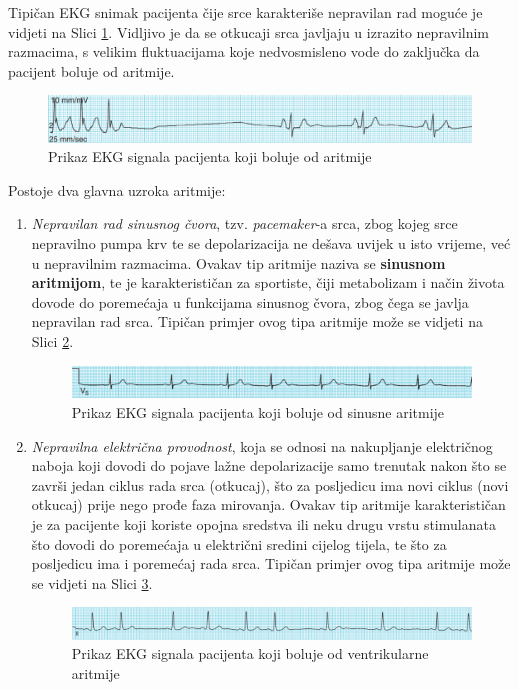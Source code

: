 \documentclass[12pt,a4paper]{article}
\begin{document}
Tipičan EKG snimak pacijenta čije srce karakteriše nepravilan rad moguće je vidjeti na Slici \ref{s2}. Vidljivo je da se otkucaji srca javljaju u izrazito nepravilnim razmacima, s velikim fluktuacijama koje nedvosmisleno vode do zaključka da pacijent boluje od aritmije.

\begin{figure}[H]
\center
\includegraphics[scale=0.6]{../res/s2.PNG}
\caption{Prikaz EKG signala pacijenta koji boluje od aritmije}
\label{s2}
\end{figure}

\quad Postoje dva glavna uzroka aritmije:

\begin{enumerate}

\item \textit{Nepravilan rad sinusnog čvora}, tzv. \textit{pacemaker}-a srca, zbog kojeg srce nepravilno pumpa krv te se depolarizacija ne dešava uvijek u isto vrijeme, već u nepravilnim razmacima. Ovakav tip aritmije naziva se \textbf{sinusnom aritmijom}, te je karakterističan za sportiste, čiji metabolizam i način života dovode do poremećaja u funkcijama sinusnog čvora, zbog čega se javlja nepravilan rad srca. Tipičan primjer ovog tipa aritmije može se vidjeti na Slici \ref{s3}.

\begin{figure}[H]
\center
\includegraphics[scale=0.7]{../res/s3.PNG}
\caption{Prikaz EKG signala pacijenta koji boluje od sinusne aritmije}
\label{s3}
\end{figure}

\item \textit{Nepravilna električna provodnost}, koja se odnosi na nakupljanje električnog naboja koji dovodi do pojave lažne depolarizacije samo trenutak nakon što se završi jedan ciklus rada srca (otkucaj), što za posljedicu ima novi ciklus (novi otkucaj) prije nego prođe faza mirovanja. Ovakav tip aritmije karakterističan je za pacijente koji koriste opojna sredstva ili neku drugu vrstu stimulanata što dovodi do poremećaja u električni sredini cijelog tijela, te što za posljedicu ima i poremećaj rada srca. Tipičan primjer ovog tipa aritmije može se vidjeti na Slici \ref{s4}.

\begin{figure}[H]
\center
\includegraphics[scale=0.6]{../res/s4.PNG}
\caption{Prikaz EKG signala pacijenta koji boluje od ventrikularne aritmije}
\label{s4}
\end{figure}

\end{enumerate}
\end{document}
